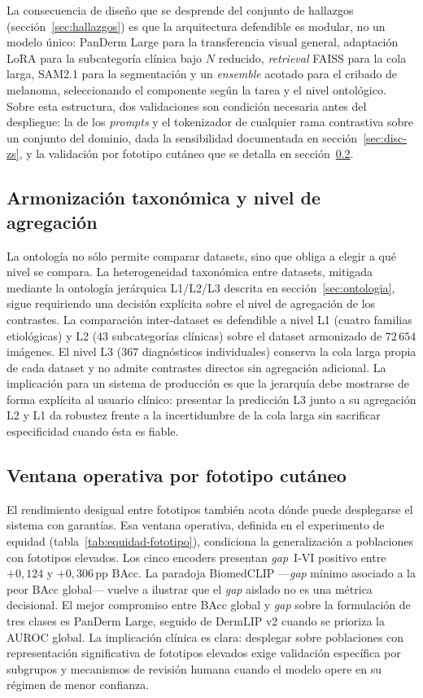 La consecuencia de diseño que se desprende del conjunto de hallazgos
(sección~\ref{sec:hallazgos}) es que la arquitectura defendible es
modular, no un modelo único: PanDerm Large para la transferencia visual
general, adaptación LoRA para la subcategoría clínica bajo $N$ reducido,
\emph{retrieval} FAISS para la cola larga, SAM2.1 para la segmentación y
un \emph{ensemble} acotado para el cribado de melanoma, seleccionando el
componente según la tarea y el nivel ontológico. Sobre esta estructura,
dos validaciones son condición necesaria antes del despliegue: la de los
\emph{prompts} y el tokenizador de cualquier rama contrastiva sobre un
conjunto del dominio, dada la sensibilidad documentada en
sección~\ref{sec:disc-zs}, y la validación por fototipo cutáneo que se
detalla en sección~\ref{sec:disc-ventana}.

\subsection{Armonización taxonómica y nivel de agregación}
\label{sec:disc-armonizacion}

La ontología no sólo permite comparar datasets, sino que obliga a
elegir a qué nivel se compara. La heterogeneidad taxonómica entre
datasets, mitigada mediante la ontología jerárquica L1/L2/L3 descrita
en sección~\ref{sec:ontologia}, sigue requiriendo una decisión
explícita sobre el nivel de agregación de los contrastes. La
comparación inter-dataset es defendible a nivel L1 (cuatro familias
etiológicas) y L2 ($43$ subcategorías clínicas) sobre el dataset
armonizado de $72\,654$ imágenes. El nivel L3 ($367$
diagnósticos individuales) conserva la cola larga propia de cada
dataset y no admite contrastes directos sin agregación adicional. La
implicación para un sistema de producción es que la jerarquía debe
mostrarse de forma explícita al usuario clínico: presentar la
predicción L3 junto a su agregación L2 y L1 da robustez frente a la
incertidumbre de la cola larga sin sacrificar especificidad cuando
ésta es fiable.

\subsection{Ventana operativa por fototipo cutáneo}
\label{sec:disc-ventana}

El rendimiento desigual entre fototipos también acota dónde puede
desplegarse el sistema con garantías. Esa ventana operativa, definida
en el experimento de equidad (tabla~\ref{tab:equidad-fototipo}),
condiciona la generalización a poblaciones con fototipos elevados.
Los cinco encoders presentan \emph{gap}~I-VI positivo entre
$+0{,}124$ y $+0{,}306$\,pp BAcc. La paradoja BiomedCLIP
---\emph{gap} mínimo asociado a la peor BAcc global--- vuelve a
ilustrar que el \emph{gap} aislado no es una métrica decisional. El
mejor compromiso entre BAcc global y \emph{gap} sobre la formulación
de tres clases es PanDerm Large, seguido de DermLIP v2 cuando se
prioriza la AUROC global. La implicación clínica es clara: desplegar
sobre poblaciones con representación significativa de fototipos
elevados exige validación específica por subgrupos y mecanismos de
revisión humana cuando el modelo opere en su régimen de menor
confianza.

